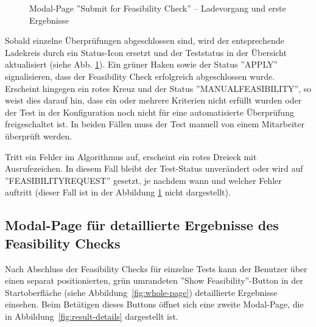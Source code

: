 \begin{figure}[!htbp] 
    \centering 
    \caption{Modal-Page ''Submit for Feasibility Check'' – Ladevorgang und erste Ergebnisse} 
    \label{fig:loading-with-results} 
\end{figure}

Sobald einzelne Überprüfungen abgeschlossen sind, wird der entsprechende Ladekreis durch ein Status-Icon ersetzt und der Teststatus in der Übersicht aktualisiert (siehe Abb. \ref{fig:loading-with-results}). Ein grüner Haken sowie der Status ''APPLY'' signalisieren, dass der Feasibility Check erfolgreich abgeschlossen wurde. Erscheint hingegen ein rotes Kreuz und der Status ''MANUALFEASIBILITY'', so weist dies darauf hin, dass ein oder mehrere Kriterien nicht erfüllt wurden oder der Test in der Konfiguration noch nicht für eine automatisierte Überprüfung freigeschaltet ist. In beiden Fällen muss der Test manuell von einem Mitarbeiter überprüft werden.

Tritt ein Fehler im Algorithmus auf, erscheint ein rotes Dreieck mit Ausrufezeichen. In diesem Fall bleibt der Test-Status unverändert oder wird auf ''FEASIBILITY\-REQUEST'' gesetzt, je nachdem wann und welcher Fehler auftritt (dieser Fall ist in der Abbildung \ref{fig:loading-with-results} nicht dargestellt).


\subsection{Modal-Page für detaillierte Ergebnisse des Feasibility Checks}

Nach Abschluss der Feasibility Checks für einzelne Tests kann der Benutzer über einen separat positionierten, grün umrandeten ''Show Feasibility''-Button in der Start\-oberfläche (siehe Abbildung~\ref{fig:whole-page}) detaillierte Ergebnisse einsehen. Beim Betätigen dieses Buttons öffnet sich eine zweite Modal-Page, die in Abbildung~\ref{fig:result-details} dargestellt ist.

